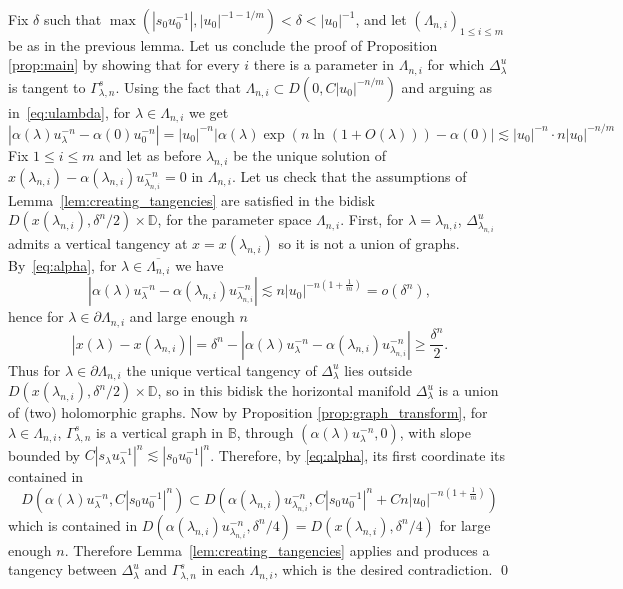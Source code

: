 \documentclass[11pt, oneside]{amsart}
\newcommand{\B}{\mathbb{B}}
\newcommand{\D}{\mathbb{D}}
\newcommand{\fr}{\partial}
\newcommand{\abs}[1]{\left\vert#1\right\vert}
\newcommand{\unsur}[1]{\frac{1}{#1}}
\newcommand{\lrpar}[1]{\left(#1\right)}
\newcommand{\inv}{^{-1}}
\theoremstyle{remark}
\theoremstyle{definition}
\theoremstyle{theorem}
\begin{document}
  
Fix $\delta$ such that 
$\max(\abs{s_0u_0\inv}, \abs{u_0}^{-1-1/m})<\delta < \abs{u_0}\inv$, and let $(\Lambda_{n,i})_{1\leq i\leq m}$ 
be as in the previous lemma.  
Let us conclude the proof of Proposition \ref{prop:main} 
by showing that for every $i$ 
there is a parameter  in $\Lambda_{n, i}$ for which 
$\Delta^u_\lambda$ is tangent to $\Gamma^s_{\lambda, n}$. 
Using the fact that 
$\Lambda_{n, i} \subset D(0, C\abs{u_0}^{-n/m})$ and arguing as in~\eqref{eq:ulambda}, for  $\lambda\in \Lambda_{n, i}$ we get 
\begin{equation}\label{eq:alpha}
\abs{\alpha(\lambda)u_\lambda^{-n}  - \alpha(0)u_0^{-n} }= \abs{u_0}^{-n} \abs{\alpha(\lambda)  \exp(n\ln(1+O(\lambda))) - \alpha(0)} \lesssim  \abs{u_0}^{-n} \cdot n\abs{u_0}^{-n/m}
\end{equation}
Fix $1\leq i\leq m$ and 
let as before $\lambda_{n,i}$ be the unique solution of 
$x(\lambda_{n,i} ) - \alpha(\lambda_{n,i}) u_{\lambda_{n,i}}^{-n}=0$  in $\Lambda_{n,i}$. Let us check that the assumptions of Lemma~\ref{lem:creating_tangencies} are satisfied in  the bidisk 
$D(x(\lambda_{n,i}), \delta^n/2)\times \D$, for the parameter space $\Lambda_{n,i}$. First, for $\lambda = \lambda_{n,i}$, $\Delta^u_{\lambda_{n,i}}$ admits a vertical tangency at $x=  x(\lambda_{n,i})$ so it is not a union of graphs. By~\eqref{eq:alpha}, for $\lambda\in  \overline{\Lambda_{n, i}}$ we have 
\begin{equation}
\abs{\alpha(\lambda) u_\lambda^{-n} - \alpha(\lambda_{n,i}) u_{\lambda_{n,i}}^{-n}}\lesssim n \abs{u_0}^{-n\lrpar{1+\unsur{m}} } = o(\delta^n),
\end{equation}
hence  for $\lambda\in \fr \Lambda_{n, i}$ and large enough $n$
\begin{equation}
\abs{x(\lambda) - x(\lambda_{n,i})}  = \delta^n - \abs{\alpha(\lambda) u_\lambda^{-n} - \alpha(\lambda_{n,i}) u_{\lambda_{n,i}}^{-n}} \geq \frac{\delta^n}{2}.
\end{equation}
Thus  for $\lambda\in \fr \Lambda_{n, i}$ the unique vertical tangency of $\Delta^u_{\lambda}$ lies outside 
$D(x(\lambda_{n,i}), \delta^n/2)\times \D$, so in this bidisk 
the horizontal manifold $\Delta^u_{\lambda}$ 
is a union of (two) holomorphic graphs. Now by Proposition \ref{prop:graph_transform}, 
  for $\lambda \in \Lambda_{n,i}$, 
$\Gamma^s_{\lambda, n}$ is a vertical graph in $\B$, through  $(\alpha(\lambda) u_\lambda^{-n}, 0)$, with slope bounded by $C\abs{s_\lambda u_\lambda\inv}^n \lesssim \abs{s_0u_0\inv}^n$. 
Therefore, by \eqref{eq:alpha}, its first coordinate its 
contained in  
\begin{equation}
D\lrpar{\alpha(\lambda)u_\lambda^{-n}, C \abs{s_0u_0\inv}^n} \subset 
D\lrpar{\alpha(\lambda_{n,i}) u_{\lambda_{n,i}}^{-n}, C \abs{s_0u_0\inv}^n+ C n \abs{u_0}^{-n\lrpar{1+\unsur{m}}}}
\end{equation}
which is contained in $D(\alpha(\lambda_{n,i}) u_{\lambda_{n,i}}^{-n} , \delta^n/4)= D(x(\lambda_{n,i}), \delta^n/4)$ for large enough $n$. Therefore 
Lemma~\ref{lem:creating_tangencies}  applies and produces a tangency between 
$\Delta^u_{\lambda}$ and 
$\Gamma^s_{\lambda, n}$ in each $\Lambda_{n,i}$, which is the desired contradiction. \qed
\end{document}
